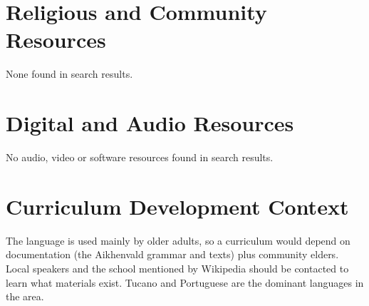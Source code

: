 \documentclass[12pt]{article}
\begin{document}
\section{Religious and Community Resources}
None found in search results.

\section{Digital and Audio Resources}
No audio, video or software resources found in search results.

\section{Curriculum Development Context}
The language is used mainly by older adults, so a curriculum would depend on documentation (the Aikhenvald grammar and texts) plus community elders. Local speakers and the school mentioned by Wikipedia should be contacted to learn what materials exist. Tucano and Portuguese are the dominant languages in the area.
\end{document}
